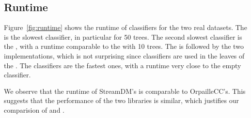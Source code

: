 \subsection{Runtime}
Figure~\ref{fig:runtime} shows the runtime of classifiers for the two real
datasets. The
\mondrianforest is the slowest classifier, in particular for 50 trees. The
second slowest classifier is the \hoeffdingtree, with a runtime comparable to the
\mondrianforest with 10 trees. The \hoeffdingtree is followed by the two \naivebayes
implementations, which is not surprising since \naivebayes classifiers are used
in the leaves of the \hoeffdingtree. The \mcnn classifiers are the fastest
ones, with a runtime very close to the empty classifier.

We observe that the runtime of StreamDM's \naivebayes is comparable to
 OrpailleCC's. This suggests that the performance of the two
 libraries is similar, which justifies our comparision of \hoeffdingtree
 and \mondrianforest.

